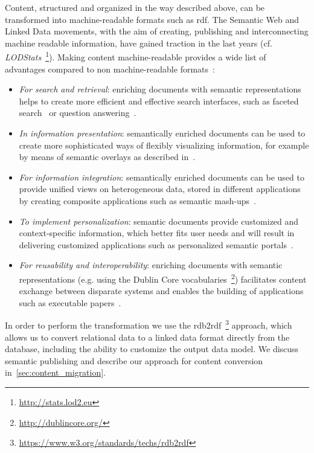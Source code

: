 \documentclass[PhD, Submit, ngerman,UKenglish,table]{scrbook}
\begin{document}
Content, structured and organized in the way described above, can be transformed into machine-readable formats such as \gls{rdf}.
The Semantic Web and Linked Data movements, with the aim of creating, publishing and interconnecting machine readable information, have gained traction in the last years (cf. \emph{LODStats}~\footnote{\url{http://stats.lod2.eu}}).
Making content machine-readable provides a wide list of advantages compared to non machine-readable formats~\cite{khalili2014semantics}:
\begin{itemize}
\item \emph{For search and retrieval}: enriching documents with semantic representations helps to create more efficient and effective search interfaces, such as faceted search~\cite{tunkelang2009faceted} or question answering~\cite{Lopez2011}.
\item \emph{In information presentation}: semantically enriched documents can be used to create more sophisticated ways of flexibly visualizing information, for example by means of semantic overlays as described in~\cite{Burel2009}.
\item \emph{For information integration}: semantically enriched documents can be used to provide unified views on heterogeneous data, stored in different applications by creating composite applications such as semantic mash-ups~\cite{ankolekar2007two}.
\item \emph{To implement personalization}: semantic documents provide customized and context-specific information, which better fits user needs and will result in delivering customized applications such as personalized semantic portals~\cite{ecs2007}.
\item \emph{For reusability and interoperability}: enriching documents with semantic representations (e.g. using the Dublin Core vocabularies~\footnote{\url{http://dublincore.org/}}) facilitates content exchange between disparate systems and enables the building of applications such as executable papers~\cite{Muller2011}.
\end{itemize}

In order to perform the transformation we use the \gls{rdb2rdf}~\footnote{\url{https://www.w3.org/standards/techs/rdb2rdf}} approach, which allows us to convert relational data to a linked data format directly from the database, including the ability to customize the output data model.
We discuss semantic publishing and describe our approach for content conversion in~\autoref{sec:content_migration}.
\end{document}

